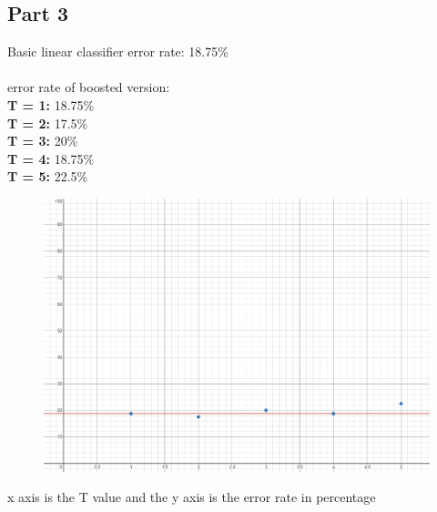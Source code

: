 \documentclass[letter]{article}
\theoremstyle{case}
\begin{document}
\subsection*{Part 3}
Basic linear classifier error rate: 18.75\%\\
\\
error rate of boosted version:\\
\textbf{T = 1:} 18.75\% \\
\textbf{T = 2:} 17.5\% \\
\textbf{T = 3:} 20\% \\
\textbf{T = 4:} 18.75\% \\
\textbf{T = 5:} 22.5\% \\

\begin{figure}[h!]
	\includegraphics[scale=0.4]{graph.png}
\end{figure} 
x axis is the T value and the y axis is the error rate in percentage
\end{document}
